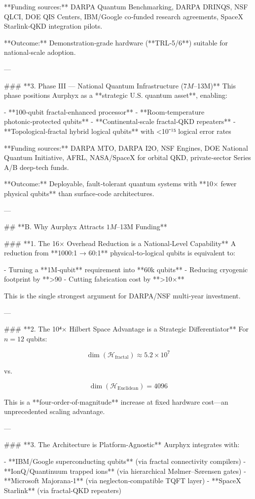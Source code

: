 **Funding sources:**  
DARPA Quantum Benchmarking, DARPA DRINQS, NSF QLCI, DOE QIS Centers, IBM/Google co‑funded research agreements, SpaceX Starlink‑QKD integration pilots.

**Outcome:**  
Demonstration‑grade hardware (**TRL‑5/6**) suitable for national‑scale adoption.

---

### **3. Phase III — National Quantum Infrastructure ($7M–$13M)**  
This phase positions Aurphyx as a **strategic U.S. quantum asset**, enabling:

- **100‑qubit fractal‑enhanced processor**  
- **Room‑temperature photonic‑protected qubits**  
- **Continental‑scale fractal‑QKD repeaters**  
- **Topological‑fractal hybrid logical qubits** with <10⁻¹⁵ logical error rates  

**Funding sources:**  
DARPA MTO, DARPA I2O, NSF Engines, DOE National Quantum Initiative, AFRL, NASA/SpaceX for orbital QKD, private‑sector Series A/B deep‑tech funds.

**Outcome:**  
Deployable, fault‑tolerant quantum systems with **10× fewer physical qubits** than surface‑code architectures.

---

## **B. Why Aurphyx Attracts $1M–$13M Funding**

### **1. The 16× Overhead Reduction is a National‑Level Capability**
A reduction from **1000:1 → 60:1** physical‑to‑logical qubits is equivalent to:

- Turning a **1M‑qubit** requirement into **60k qubits**  
- Reducing cryogenic footprint by **>90%
- Cutting fabrication cost by **>10×**

This is the single strongest argument for DARPA/NSF multi‑year investment.

---

### **2. The 10⁴× Hilbert Space Advantage is a Strategic Differentiator**
For \(n = 12\) qubits:

\[
\dim(\mathcal{H}_{\mathrm{fractal}}) \approx 5.2 \times 10^7
\]

vs.

\[
\dim(\mathcal{H}_{\mathrm{Euclidean}}) = 4096
\]

This is a **four‑order‑of‑magnitude** increase at fixed hardware cost—an unprecedented scaling advantage.

---

### **3. The Architecture is Platform‑Agnostic**
Aurphyx integrates with:

- **IBM/Google superconducting qubits** (via fractal connectivity compilers)  
- **IonQ/Quantinuum trapped ions** (via hierarchical Mølmer–Sørensen gates)  
- **Microsoft Majorana‑1** (via neglecton‑compatible TQFT layer)  
- **SpaceX Starlink** (via fractal‑QKD repeaters)  

